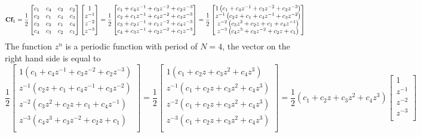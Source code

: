 \documentclass[revised,endfloat]{geophysics}
\begin{document}
\begin{equation}
{\bf C}{\bf f}_1 = \frac{1}{2}
\begin{bmatrix}
c_1 & c_4 & c_3 & c_2  \\ 
c_2 & c_1 & c_4 & c_3  \\ 
c_3 & c_2 & c_1 & c_4  \\ 
c_4 & c_3 & c_2 & c_1 
\end{bmatrix}
\begin{bmatrix}
1 \\
z^{-1} \\
z^{-2} \\
z^{-3} 
\end{bmatrix}
= \frac{1}{2}
\begin{bmatrix}
c_1 + c_4 z^{-1} + c_3 z^{-2} + c_2 z^{-3}  \\
c_2 + c_1 z^{-1} + c_4 z^{-2} + c_3 z^{-3}  \\
c_3 + c_2 z^{-1} + c_1 z^{-2} + c_4 z^{-3}  \\
c_4 + c_3 z^{-1} + c_2 z^{-2} + c_1 z^{-3}  \\
\end{bmatrix}
= \frac{1}{2}
\begin{bmatrix}
1\left(c_1 + c_4 z^{-1} + c_3 z^{-2} + c_2 z^{-3} \right)  \\
z^{-1} \left(c_2 z    + c_1 + c_4 z^{-1} + c_3 z^{-2} \right)  \\
z^{-2} \left(c_3 z^2+ c_2 z + c_1 + c_4 z^{-1} \right)  \\
z^{-3} \left(c_4 z^3+ c_3 z^{-2} + c_2 z + c_1 \right) \\
\end{bmatrix}
\end{equation}
The function $z^n$ is a periodic function with period of $N=4$, the vector on the right hand side is equal to
\begin{equation}
\frac{1}{2}
\begin{bmatrix}
1\left(c_1 + c_4 z^{-1} + c_3 z^{-2} + c_2 z^{-3} \right)  \\
z^{-1} \left(c_2 z    + c_1 + c_4 z^{-1} + c_3 z^{-2} \right)  \\
z^{-2} \left(c_3 z^2+ c_2 z + c_1 + c_4 z^{-1} \right)  \\
z^{-3} \left(c_4 z^3+ c_3 z^{-2} + c_2 z + c_1 \right) \\
\end{bmatrix}
=
\frac{1}{2}
\begin{bmatrix}
1         \left(c_1 + c_2 z + c_3 z^2 + c_4 z^3 \right)  \\
z^{-1} \left(c_1 + c_2 z + c_3 z^2 + c_4 z^3 \right)  \\
z^{-2} \left(c_1 + c_2 z + c_3 z^2 + c_4 z^3 \right)  \\
z^{-3} \left(c_1 + c_2 z + c_3 z^2 + c_4 z^3 \right) \\
\end{bmatrix} 
= 
\frac{1}{2}\left(c_1 + c_2 z + c_3 z^2 + c_4 z^3 \right) 
\begin{bmatrix}
1         \\
z^{-1} \\
z^{-2} \\
z^{-3} \\
\end{bmatrix} 
\end{equation}
\end{document}
